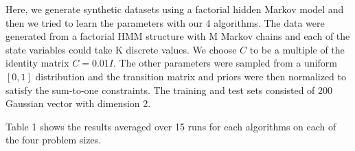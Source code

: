 \documentclass[10pt,a4paper]{report}
\begin{document}
	


Here, we generate synthetic datasets using a factorial hidden Markov model and then we tried to learn the parameters with our 4 algorithms. The data were generated from a factorial HMM structure with M Markov chains and each of the state variables could take K discrete values. We choose $C$ to be a multiple of the identity matrix $C = 0.01 I$. The other parameters were sampled from a uniform $[0,1]$ distribution and the transition matrix and priors were then normalized to satisfy the sum-to-one constraints. The training and test sets consisted of 200 Gaussian vector with dimension 2. 

Table 1 shows the results averaged over 15 runs for each algorithms on each of the four problem sizes. 
\end{document}
